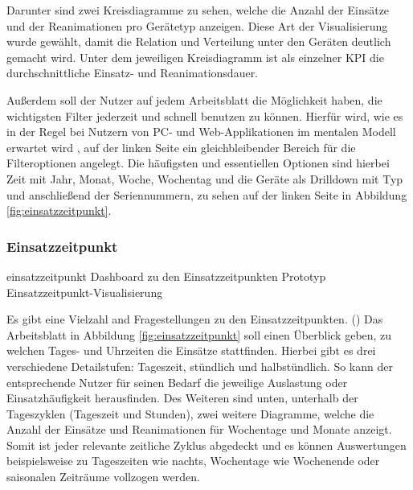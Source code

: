 
Darunter sind zwei Kreisdiagramme zu sehen, welche die Anzahl der Einsätze und der Reanimationen pro Gerätetyp anzeigen.
Diese Art der Visualisierung wurde gewählt, damit die Relation und Verteilung unter den Geräten deutlich gemacht wird.
Unter dem jeweiligen Kreisdiagramm ist als einzelner \gls{KPI} die durchschnittliche Einsatz- und Reanimationsdauer.


\label{par:filter}
Außerdem soll der Nutzer auf jedem Arbeitsblatt die Möglichkeit haben, die wichtigsten Filter jederzeit und schnell benutzen zu können.
Hierfür wird, wie es in der Regel bei Nutzern von PC- und Web-Applikationen im mentalen Modell erwartet wird \cite{Grunwied.2017}, auf der linken Seite ein gleichbleibender Bereich für die Filteroptionen angelegt.
Die häufigsten und essentiellen Optionen sind hierbei Zeit mit Jahr, Monat, Woche, Wochentag und die Geräte als \gls{Drilldown} mit Typ und anschließend der Seriennummern, zu sehen auf der linken Seite in Abbildung \ref{fig:einsatzzeitpunkt}.

\subsubsection{Einsatzzeitpunkt}
\label{subsub:zeitpunkt}
\bildbreit
{einsatzzeitpunkt}
{Dashboard zu den Einsatzzeitpunkten}
{Prototyp Einsatzzeitpunkt-Visualisierung}

Es gibt eine Vielzahl and Fragestellungen zu den Einsatzzeitpunkten. ()
Das Arbeitsblatt in Abbildung \ref{fig:einsatzzeitpunkt} soll einen Überblick geben, zu welchen Tages- und Uhrzeiten die Einsätze stattfinden.
Hierbei gibt es drei verschiedene Detailstufen: Tageszeit, stündlich und halbstündlich. 
So kann der entsprechende Nutzer für seinen Bedarf die jeweilige Auslastung oder Einsatzhäufigkeit herausfinden.
Des Weiteren sind unten, unterhalb der Tageszyklen (Tageszeit und Stunden), zwei weitere Diagramme, welche die Anzahl der Einsätze und Reanimationen für Wochentage und Monate anzeigt. 
Somit ist jeder relevante zeitliche Zyklus abgedeckt und es können Auswertungen beispielsweise zu Tageszeiten wie nachts, Wochentage wie Wochenende oder saisonalen Zeiträume vollzogen werden.

